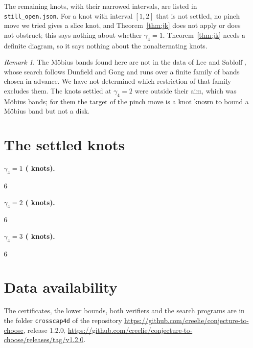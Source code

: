 \documentclass[11pt]{amsart}
\theoremstyle{definition}
\theoremstyle{remark}
\newtheorem{remark}[theorem]{Remark}
\begin{document}
The remaining \nopen{} knots, with their narrowed intervals, are listed in
\texttt{still\_open.json}. For a knot with interval $[1,2]$ that is not settled, no pinch
move we tried gives a slice knot, and Theorem~\ref{thm:jk} does not apply or does not
obstruct; this says nothing about whether $\gamma_4=1$. Theorem~\ref{thm:jk} needs a definite
diagram, so it says nothing about the nonalternating knots.

\begin{remark}
The \nclosedone{} M\"obius bands found here are not in the data of Lee and Sabloff
\cite{LS}, whose search follows Dunfield and Gong \cite{DG} and runs over a finite family of
bands chosen in advance. We have not determined which restriction of that family excludes
them. The knots settled at $\gamma_4=2$ were outside their aim, which was M\"obius bands;
for them the target of the pinch move is a knot known to bound a M\"obius band but not a disk.
\end{remark}

\appendix
\section{The settled knots}\label{app:list}

{\footnotesize
\noindent\textbf{$\gamma_4=1$ (\nsettledone{} knots).}
\begin{multicols}{6}\raggedright
\listone
\end{multicols}

\noindent\textbf{$\gamma_4=2$ (\nsettledtwo{} knots).}
\begin{multicols}{6}\raggedright
\listtwo
\end{multicols}

\noindent\textbf{$\gamma_4=3$ (\nsettledthree{} knots).}
\begin{multicols}{6}\raggedright
\listthree
\end{multicols}
}

\section*{Data availability}
The certificates, the lower bounds, both verifiers and the search programs are in the folder \texttt{crosscap4d}
of the repository \url{https://github.com/creelie/conjecture-to-choose}, release 1.2.0,
\url{https://github.com/creelie/conjecture-to-choose/releases/tag/v1.2.0}.
\end{document}
